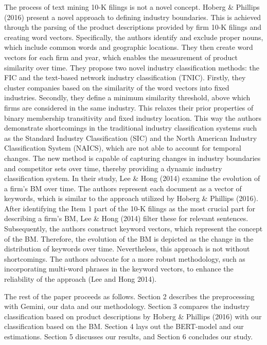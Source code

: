 \documentclass[
]{article}
\begin{document}
The process of text mining 10-K filings is not a novel concept. Hoberg
\& Phillips (2016) present a novel approach to defining industry
boundaries. This is achieved through the parsing of the product
descriptions provided by firm 10-K filings and creating word vectors.
Specifically, the authors identify and exclude proper nouns, which
include common words and geographic locations. They then create word
vectors for each firm and year, which enables the measurement of product
similarity over time. They propose two novel industry classification
methods: the FIC and the text-based network industry classification
(TNIC). Firstly, they cluster companies based on the similarity of the
word vectors into fixed industries. Secondly, they define a minimum
similarity threshold, above which firms are considered in the same
industry. This relaxes their prior properties of binary membership
transitivity and fixed industry location. This way the authors
demonstrate shortcomings in the traditional industry classification
systems such as the Standard Industry Classification (SIC) and the North
American Industry Classification System (NAICS), which are not able to
account for temporal changes. The new method is capable of capturing
changes in industry boundaries and competitor sets over time, thereby
providing a dynamic industry classification system. In their study, Lee
\& Hong (2014) examine the evolution of a firm's BM over time. The
authors represent each document as a vector of keywords, which is
similar to the approach utilized by Hoberg \& Phillips (2016). After
identifying the Item 1 part of the 10-K filings as the most crucial part
for describing a firm's BM, Lee \& Hong (2014) filter these for relevant
sentences. Subsequently, the authors construct keyword vectors, which
represent the concept of the BM. Therefore, the evolution of the BM is
depicted as the change in the distribution of keywords over time.
Nevertheless, this approach is not without shortcomings. The authors
advocate for a more robust methodology, such as incorporating multi-word
phrases in the keyword vectors, to enhance the reliability of the
approach (Lee and Hong 2014).

The rest of the paper proceeds as follows. Section 2 describes the
preprocessing with Gemini, our data and our methodology. Section 3
compares the industry classification based on product descriptions by
Hoberg \& Phillips (2016) with our classification based on the BM.
Section 4 lays out the BERT-model and our estimations. Section 5
discusses our results, and Section 6 concludes our study.
\end{document}
